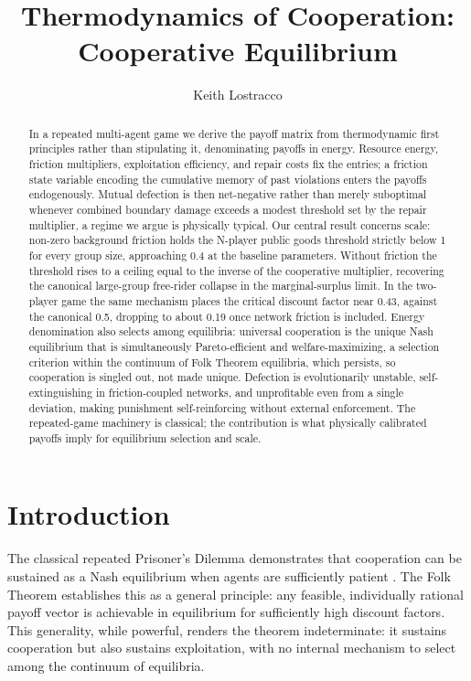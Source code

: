 \documentclass[11pt]{article}
\title{Thermodynamics of Cooperation: Cooperative Equilibrium}
\author{%
Keith Lostracco%
}
\date{}
\theoremstyle{plain}
\theoremstyle{definition}
\theoremstyle{remark}
\let\origsection\section
\renewcommand{\section}{\needspace{12\baselineskip}\origsection}
\begin{document}
\maketitle

\begin{abstract}
In a repeated multi-agent game we derive the payoff matrix from
thermodynamic first principles rather than stipulating it, denominating
payoffs in energy. Resource energy, friction multipliers, exploitation
efficiency, and repair costs fix the entries; a friction state variable
encoding the cumulative memory of past violations enters the payoffs
endogenously. Mutual defection is then net-negative rather than merely
suboptimal whenever combined boundary damage exceeds a modest threshold
set by the repair multiplier, a regime we argue is physically typical.
Our central result concerns scale: non-zero background friction holds
the N-player public goods threshold strictly below 1 for every group
size, approaching 0.4 at the baseline parameters. Without friction the
threshold rises to a ceiling equal to the inverse of the cooperative
multiplier, recovering the canonical large-group free-rider collapse in
the marginal-surplus limit. In the two-player game the same mechanism
places the critical discount factor near 0.43, against the canonical
0.5, dropping to about 0.19 once network friction is included. Energy
denomination also selects among equilibria: universal cooperation is the
unique Nash equilibrium that is simultaneously Pareto-efficient and
welfare-maximizing, a selection criterion within the continuum of Folk
Theorem equilibria, which persists, so cooperation is singled out, not
made unique. Defection is evolutionarily unstable, self-extinguishing in
friction-coupled networks, and unprofitable even from a single
deviation, making punishment self-reinforcing without external
enforcement. The repeated-game machinery is classical; the contribution
is what physically calibrated payoffs imply for equilibrium selection
and scale.
\end{abstract}
\section{Introduction}\label{introduction}

The classical repeated Prisoner's Dilemma demonstrates that cooperation
can be sustained as a Nash equilibrium when agents are sufficiently
patient \citep{Fudenberg1986, Fudenberg1991}. The Folk Theorem
establishes this as a general principle: any feasible, individually
rational payoff vector is achievable in equilibrium for sufficiently
high discount factors. This generality, while powerful, renders the
theorem indeterminate: it sustains cooperation but also sustains
exploitation, with no internal mechanism to select among the continuum
of equilibria.
\end{document}
